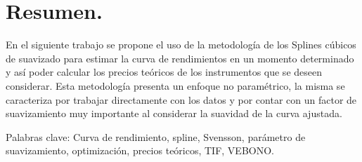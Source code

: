 \chapter*{Resumen.}



\hspace{0.4cm} En el siguiente trabajo se propone el uso de la metodolog\'ia de los Splines c\'ubicos de suavizado para estimar la curva de rendimientos en un momento determinado y as\'i poder calcular los precios te\'oricos de los instrumentos que se deseen considerar. Esta metodolog\'ia presenta un enfoque no param\'etrico, la misma se caracteriza por trabajar directamente con los datos y por contar con un factor de suavizamiento muy importante al considerar la suavidad de la curva ajustada. 

Palabras clave: Curva de rendimiento, spline, Svensson, par\'ametro de suavizamiento, optimizaci\'on, precios te\'oricos, TIF, VEBONO.
